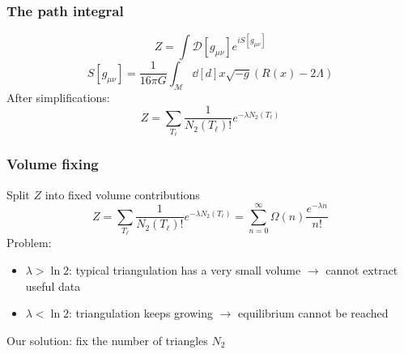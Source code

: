 \begin{frame}
    \frametitle{The path integral}
    \begin{equation}
        Z = \int \mathcal{D}[g_{\mu \nu}] e^{i S[g_{\mu \nu}]}
    \end{equation}
    \begin{equation}
        S[g_{\mu \nu}]
        =
        \frac{1}{16 \pi G}
        \int_\mathcal{M} \dd[d]{x} \sqrt{-g}
        (R(x) - 2 \Lambda)
    \end{equation}
    After simplifications: %
    \begin{equation}
        Z = \sum_{T_\ell} \frac{1}{N_2(T_\ell)!} e^{-\lambda N_2(T_\ell)}
    \end{equation}
\end{frame}

\begin{frame}
    \frametitle{Volume fixing}
    Split $Z$ into fixed volume contributions
    \begin{equation}
        Z
        =
        \sum_{T_\ell} \frac{1}{N_2(T_\ell)!} e^{-\lambda N_2(T_\ell)}
        =
        \sum_{n = 0}^\infty \Omega(n) \frac{e^{-\lambda n}}{n!}
    \end{equation}
    Problem:
    \begin{itemize}
        \item $\lambda > \ln 2$: typical triangulation has a very small volume $\to$ cannot extract useful data
        \item $\lambda < \ln 2$: triangulation keeps growing $\to$ equilibrium cannot be reached
    \end{itemize}
    Our solution: fix the number of triangles $N_2$
\end{frame}